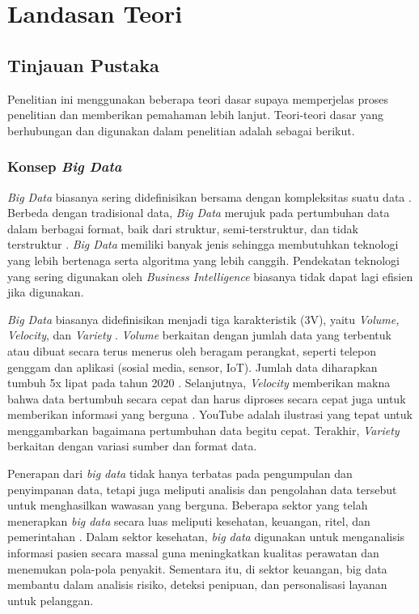 \chapter{Landasan Teori}

\section{Tinjauan Pustaka}
Penelitian ini menggunakan beberapa teori dasar supaya memperjelas proses penelitian dan memberikan pemahaman lebih lanjut. Teori-teori dasar yang berhubungan dan digunakan dalam penelitian adalah sebagai berikut.

\subsection{Konsep \textit{Big Data}}
\textit{Big Data} biasanya sering didefinisikan bersama dengan kompleksitas suatu data \cite{barosenAnalysisComparisonInterfacing2018}. Berbeda dengan tradisional data, \textit{Big Data} merujuk pada pertumbuhan data dalam berbagai format, baik dari struktur, semi-terstruktur, dan tidak terstruktur \cite{oussousBigDataTechnologies2018}. \textit{Big Data} memiliki banyak jenis sehingga membutuhkan teknologi yang lebih bertenaga serta algoritma yang lebih canggih. Pendekatan teknologi yang sering digunakan oleh \textit{Business Intelligence} biasanya tidak dapat lagi efisien jika digunakan.

\textit{Big Data} biasanya didefinisikan menjadi tiga karakteristik (3V), yaitu \textit{Volume, Velocity}, dan \textit{Variety} \cite{furhtIntroductionBigData2016}. \textit{Volume} berkaitan dengan jumlah data yang terbentuk atau dibuat secara terus menerus oleh beragam  perangkat, seperti telepon genggam dan aplikasi (sosial media, sensor, IoT). Jumlah data diharapkan tumbuh 5x lipat pada tahun 2020 \cite{furhtIntroductionBigData2016}. Selanjutnya, \textit{Velocity} memberikan makna bahwa data bertumbuh secara cepat dan harus diproses secara cepat juga untuk memberikan informasi yang berguna \cite{sandhuBigDataCloud2022}. YouTube adalah ilustrasi yang tepat untuk menggambarkan bagaimana pertumbuhan data begitu cepat. Terakhir, \textit{Variety} berkaitan dengan variasi sumber dan format data. 

Penerapan dari \textit{big data} tidak hanya terbatas pada pengumpulan dan penyimpanan data, tetapi juga meliputi analisis dan pengolahan data tersebut untuk menghasilkan wawasan yang berguna. Beberapa sektor yang telah menerapkan \textit{big data} secara luas meliputi kesehatan, keuangan, ritel, dan pemerintahan \cite{oussousBigDataTechnologies2018}. Dalam sektor kesehatan, \textit{big data} digunakan untuk menganalisis informasi pasien secara massal guna meningkatkan kualitas perawatan dan menemukan pola-pola penyakit. Sementara itu, di sektor keuangan, big data membantu dalam analisis risiko, deteksi penipuan, dan personalisasi layanan untuk pelanggan.


